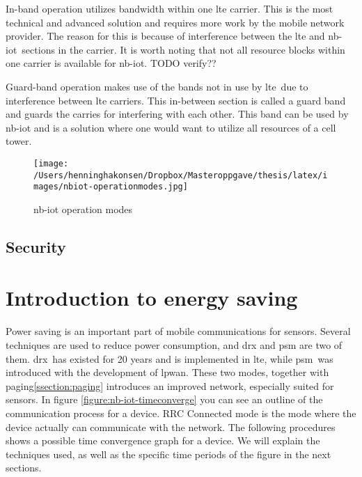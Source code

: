 \documentclass[USenglish]{ifimaster}  %
\begin{document}
In-band operation utilizes bandwidth within one \acrshort{lte} carrier. This is the most technical and advanced solution and requires more work by the mobile network provider. The reason for this is because of interference between the \acrshort{lte} and \acrshort{nb-iot} sections in the carrier. It is worth noting that not all resource blocks within one carrier is available for \acrshort{nb-iot}. TODO verify??

Guard-band operation makes use of the bands not in use by \acrshort{lte} due to interference between \acrshort{lte} carriers. This in-between section is called a guard band and guards the carries for interfering with each other. This band can be used by \acrshort{nb-iot} and is a solution where one would want to utilize all resources of a cell tower.

\begin{figure}[ht]
  \centering\texttt{[image: /Users/henninghakonsen/Dropbox/Masteroppgave/thesis/latex/images/nbiot-operationmodes.jpg]}
  \caption{\acrshort{nb-iot} operation modes \cite{online:legacyWire}}
  \label{figure:nbiot-operationmodes}
\end{figure}

\subsection{Security} \label{ssection:nb-iot-security}

\section{Introduction to energy saving} \label{section:energysaving}
Power saving is an important part of mobile communications for sensors. Several techniques are used to reduce power consumption, and \acrfull{drx} and \acrfull{psm} are two of them. \acrshort{drx} has existed for 20 years and is implemented in \acrshort{lte}, while \acrshort{psm} was introduced with the development of \acrshort{lpwan}. These two modes, together with paging\ref{ssection:paging} introduces an improved network, especially suited for sensors. In figure \vref{figure:nb-iot-timeconverge} you can see an outline of the communication process for a device. RRC Connected mode is the mode where the device actually can communicate with the network. The following procedures shows a possible time convergence graph for a device. We will explain the techniques used, as well as the specific time periods of the figure in the next sections.
\end{document}
